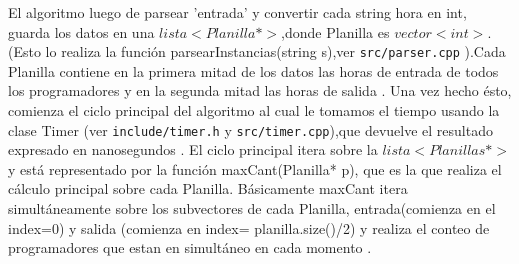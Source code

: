 El algoritmo luego de parsear 'entrada' y convertir cada string hora en  int, guarda los datos  en una \emph{$lista< Planilla*>$},donde Planilla es \emph{$vector<int>$}. (Esto lo realiza la función parsearInstancias(string s),ver \texttt{src/parser.cpp} ).Cada Planilla contiene en la primera mitad de los datos las horas de entrada de todos los programadores y en la segunda mitad las horas de salida .
\newline
Una vez hecho ésto, comienza el ciclo principal del algoritmo al cual le tomamos el tiempo usando la clase Timer (ver \texttt{include/timer.h} y \texttt{src/timer.cpp}),que devuelve el resultado expresado en nanosegundos .
\newline
El ciclo principal  itera sobre la \emph{$lista<Planillas*>$}  y  está representado por la función maxCant(Planilla* p), que es la que realiza el cálculo principal sobre cada Planilla.
\newline
Básicamente maxCant itera simultáneamente sobre los subvectores de cada Planilla, entrada(comienza en el index=0) y salida (comienza en index= planilla.size()/2) y realiza el conteo de programadores que estan en simultáneo en cada momento .


